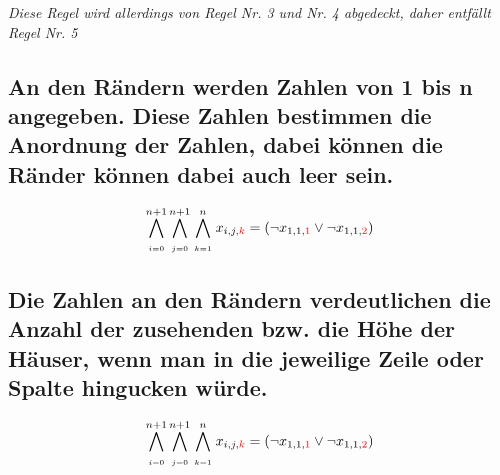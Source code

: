 \documentclass[11pt, a4paper]{article}
\begin{document}
	\textit{Diese Regel wird allerdings von Regel Nr. 3 und Nr. 4 abgedeckt, daher entfällt Regel Nr. 5}
	\bigskip
	
	\subsection{An den Rändern werden Zahlen von 1 bis n angegeben. Diese Zahlen bestimmen die Anordnung der Zahlen, dabei können die Ränder können dabei auch leer sein.}

		\begin{align*}
			\bigwedge_{\atop i=0}^{n+1} \bigwedge_{\atop j=0}^{n+1} \bigwedge_{\atop k=1}^{n}
			x_{i,j,{\color{red} k}} = 
			(\neg x_{1,1,{\color{red} 1}} \vee \neg x_{1,1,{\color{red} 2}})
		\end{align*}
		
	
	\subsection{Die Zahlen an den Rändern verdeutlichen die Anzahl der zusehenden bzw. die Höhe der Häuser, wenn man in die jeweilige Zeile oder Spalte hingucken würde.}
	
	\begin{align*}
		\bigwedge_{\atop i=0}^{n+1} \bigwedge_{\atop j=0}^{n+1} \bigwedge_{\atop k=1}^{n}
		x_{i,j,{\color{red} k}} = 
		(\neg x_{1,1,{\color{red} 1}} \vee \neg x_{1,1,{\color{red} 2}})
	\end{align*}
	
	
	
\end{document}

